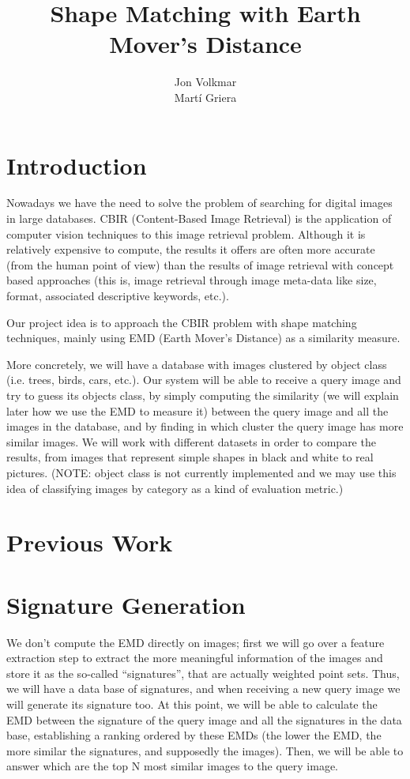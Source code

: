 \documentclass[10pt,a4paper]{article}
\title{\textbf{Shape Matching with Earth Mover's Distance}}
\author{Jon Volkmar\\
		Mart\'{i} Griera}
\date{}
\begin{document}
\maketitle

\section{Introduction}

Nowadays we have the need to solve the problem of searching for digital images in large databases. CBIR (Content-Based Image Retrieval) is the application of computer vision techniques to this image retrieval problem. Although it is relatively expensive to compute, the results it offers are often more accurate (from the human point of view) than the results of image retrieval with concept based approaches (this is, image retrieval through image meta-data like size, format, associated descriptive keywords, etc.).

Our project idea is to approach the CBIR problem with shape matching techniques, mainly using EMD (Earth Mover's Distance) as a similarity measure.
	
More concretely, we will have a database with images clustered by object class (i.e. trees, birds, cars, etc.). Our system will be able to receive a query image and try to guess its objects class, by simply computing the similarity (we will explain later how we use the EMD to measure it) between the query image and all the images in the database, and by finding in which cluster the query image has more similar images. We will work with different datasets in order to compare the results, from images that represent simple shapes in black and white to real pictures. (NOTE: object class is not currently implemented and we may use this idea of classifying images by category as a kind of evaluation metric.)

\section{Previous Work}

\section{Signature Generation}

We don't compute the EMD directly on images; first we will go over a feature extraction step to extract the more meaningful information of the images and store it as the so-called “signatures”, that are actually weighted point sets. Thus, we will have a data base of signatures, and when receiving a new query image we will generate its signature too. At this point, we will be able to calculate the EMD between the signature of the query image and all the signatures in the data base, establishing a ranking ordered by these EMDs (the lower the EMD, the more similar the signatures, and supposedly the images). Then, we will be able to answer which are the top N most similar images to the query image.
\end{document}
